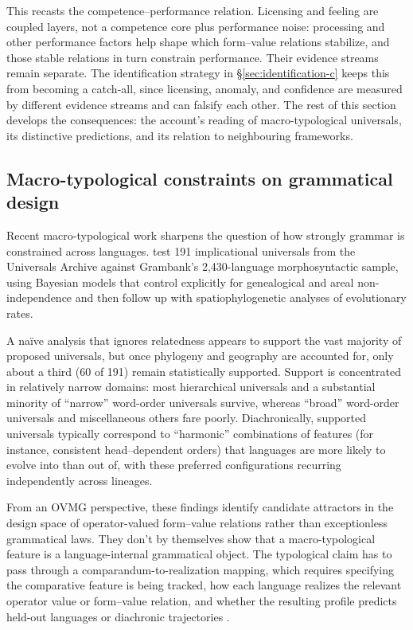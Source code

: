 \documentclass[12pt,letterpaper]{article}
\begin{document}
This recasts the competence--performance relation. Licensing and feeling are coupled layers, not a competence core plus performance noise: processing and other performance factors help shape which form--value relations stabilize, and those stable relations in turn constrain performance. Their evidence streams remain separate. The identification strategy in \S\ref{sec:identification-c} keeps this from becoming a catch-all, since licensing, anomaly, and confidence are measured by different evidence streams and can falsify each other. The rest of this section develops the consequences: the account's reading of macro-typological universals, its distinctive predictions, and its relation to neighbouring frameworks.

\subsection{Macro-typological constraints on grammatical design}

Recent macro-typological work sharpens the question of how strongly grammar is
constrained across languages. \textcite{verkerk2025} test 191 implicational
universals from the Universals Archive against Grambank's 2{,}430-language
morphosyntactic sample, using Bayesian models that control explicitly for
genealogical and areal non-independence and then follow up with
spatiophylogenetic analyses of evolutionary rates.

A naïve analysis that ignores relatedness appears to support the vast majority
of proposed universals, but once phylogeny and geography are accounted for, only
about a third (60 of 191) remain statistically supported. Support is concentrated
in relatively narrow domains: most hierarchical universals and a substantial
minority of \enquote{narrow} word-order universals survive, whereas
\enquote{broad} word-order universals and miscellaneous others fare poorly.
Diachronically, supported universals typically correspond to \enquote{harmonic}
combinations of features (for instance, consistent head--dependent orders) that
languages are more likely to evolve into than out of, with these preferred
configurations recurring independently across lineages.

From an OVMG perspective, these findings identify candidate attractors in the
design space of operator-valued form--value relations rather than exceptionless
grammatical laws. They don't by themselves show that a macro-typological feature
is a language-internal grammatical object. The typological claim has to pass
through a comparandum-to-realization mapping, which requires specifying the comparative
feature is being tracked, how each language realizes the relevant operator value
or form--value relation, and whether the resulting profile predicts held-out
languages or diachronic trajectories \autocite{reynolds2025comparanda}.
\end{document}
